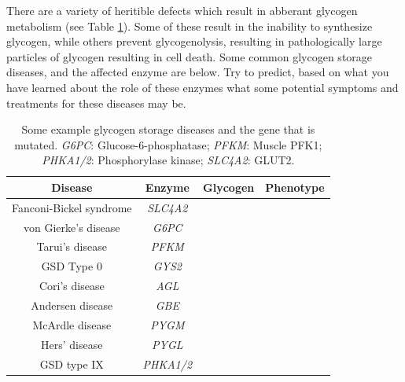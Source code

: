 \documentclass{tufte-handout}
\begin{document}
There are a variety of heritible defects which result in abberant glycogen metabolism (see Table \ref{tab:glycogen-storage-diseases}).  Some of these result in the inability to synthesize glycogen, while others prevent glycogenolysis, resulting in pathologically large particles of glycogen resulting in cell death.  Some common glycogen storage diseases, and the affected enzyme are below.   Try to predict, based on what you have learned about the role of these enzymes what some potential symptoms and treatments for these diseases may be.

\begin{table}
\centering
\caption{Some example glycogen storage diseases and the gene that is mutated.  \textit{G6PC}: Glucose-6-phosphatase; \textit{PFKM}: Muscle PFK1; \textit{PHKA1/2}: Phosphorylase kinase; \textit{SLC4A2}: GLUT2.}
\label{tab:glycogen-storage-diseases}
\begin{tabular}{cccc}
\hline
\textbf {Disease} & \textbf{Enzyme} & \textbf{Glycogen} &  \textbf{Phenotype} \\
\hline
Fanconi-Bickel syndrome & \textit{SLC4A2} & &  \\
von Gierke's disease & \textit{G6PC} & & \\
Tarui's disease & \textit{PFKM} & & \\
GSD Type 0 & \textit{GYS2} & & \\
Cori's disease & \textit{AGL} &  &\\
Andersen disease & \textit{GBE} & & \\
McArdle disease& \textit{PYGM} & & \\
Hers' disease & \textit{PYGL} & & \\
GSD type IX & \textit{PHKA1/2} & & \\
\hline
\end{tabular}
\end{table}




\end{document}

